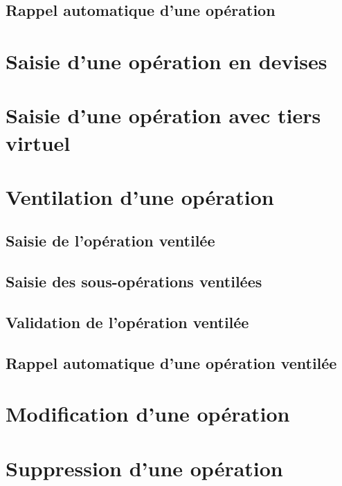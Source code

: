 \subsection{Rappel automatique d'une opération\label{transactions-new-recall}}


\section{Saisie d'une opération en devises\label{transactions-currencies}}


\section{Saisie d'une opération avec tiers virtuel\label{transactions-virtualThird}}


\section{Ventilation d'une opération\label{transactions-breakdown}}

\subsection{Saisie de l'opération ventilée\label{transactions-breakdown-master}}


\subsection{Saisie des sous-opérations ventilées\label{transactions-breakdown-slave}}


\subsection{Validation de l'opération ventilée\label{transactions-breakdown-validation}}


\subsection{Rappel automatique d'une opération ventilée\label{transactions-breakdown-recall}}


\section{Modification d'une opération\label{transactions-modify}}


\section{Suppression d'une opération\label{transactions-delete}}


